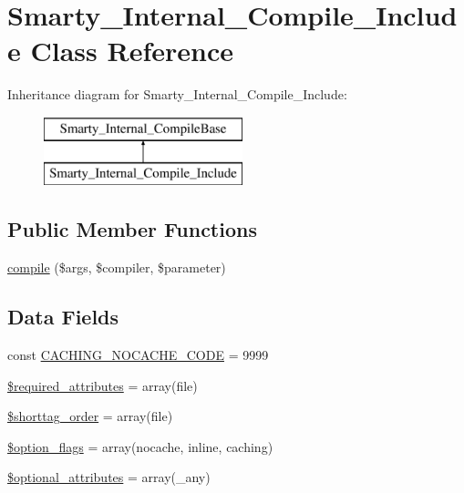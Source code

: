 \hypertarget{class_smarty___internal___compile___include}{}\section{Smarty\+\_\+\+Internal\+\_\+\+Compile\+\_\+\+Include Class Reference}
\label{class_smarty___internal___compile___include}
Inheritance diagram for Smarty\+\_\+\+Internal\+\_\+\+Compile\+\_\+\+Include\+:\begin{figure}[H]
\begin{center}
\leavevmode
\includegraphics[height=2.000000cm]{class_smarty___internal___compile___include}
\end{center}
\end{figure}
\subsection*{Public Member Functions}
\begin{DoxyCompactItemize}
\item 
\hyperlink{class_smarty___internal___compile___include_a84998958b9fc8c11c2ebe9620a49b853}{compile} (\$args, \$compiler, \$parameter)
\end{DoxyCompactItemize}
\subsection*{Data Fields}
\begin{DoxyCompactItemize}
\item 
const \hyperlink{class_smarty___internal___compile___include_ae23cc7a160b3b25f711de516d663ac54}{C\+A\+C\+H\+I\+N\+G\+\_\+\+N\+O\+C\+A\+C\+H\+E\+\_\+\+C\+O\+D\+E} = 9999
\item 
\hyperlink{class_smarty___internal___compile___include_ae799507d5461de485f3a618abeecea95}{\$required\+\_\+attributes} = array(\textquotesingle{}file\textquotesingle{})
\item 
\hyperlink{class_smarty___internal___compile___include_a2ccb25269c3a92e8c4796c7ef23725e6}{\$shorttag\+\_\+order} = array(\textquotesingle{}file\textquotesingle{})
\item 
\hyperlink{class_smarty___internal___compile___include_a54756b34496938296f08038f7cf7c46a}{\$option\+\_\+flags} = array(\textquotesingle{}nocache\textquotesingle{}, \textquotesingle{}inline\textquotesingle{}, \textquotesingle{}caching\textquotesingle{})
\item 
\hyperlink{class_smarty___internal___compile___include_a899d1eb4a6fecbd6ce696adb171c80a4}{\$optional\+\_\+attributes} = array(\textquotesingle{}\+\_\+any\textquotesingle{})
\end{DoxyCompactItemize}


